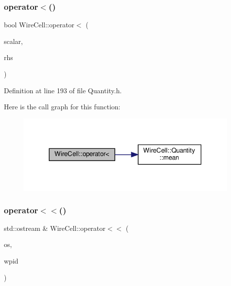 \subsubsection{\texorpdfstring{operator$<$()}{operator<()}\hspace{0.1cm}{\footnotesize\ttfamily [2/2]}}
{\footnotesize\ttfamily bool Wire\+Cell\+::operator$<$ (\begin{DoxyParamCaption}\item[{const double \&}]{scalar,  }\item[{const \hyperlink{class_wire_cell_1_1_quantity}{Wire\+Cell\+::\+Quantity} \&}]{rhs }\end{DoxyParamCaption})\hspace{0.3cm}{\ttfamily [inline]}}



Definition at line 193 of file Quantity.\+h.

Here is the call graph for this function\+:
\nopagebreak
\begin{figure}[H]
\begin{center}
\leavevmode
\includegraphics[width=314pt]{namespace_wire_cell_a143feb235cfb5761b0691c4d1c129ca3_cgraph}
\end{center}
\end{figure}
\mbox{\label{namespace_wire_cell_a470282420df828d72316462cefed8139}} 
\subsubsection{\texorpdfstring{operator$<$$<$()}{operator<<()}\hspace{0.1cm}{\footnotesize\ttfamily [1/6]}}
{\footnotesize\ttfamily std\+::ostream \& Wire\+Cell\+::operator$<$$<$ (\begin{DoxyParamCaption}\item[{std\+::ostream \&}]{os,  }\item[{const \hyperlink{class_wire_cell_1_1_wire_plane_id}{Wire\+Cell\+::\+Wire\+Plane\+Id} \&}]{wpid }\end{DoxyParamCaption})}



